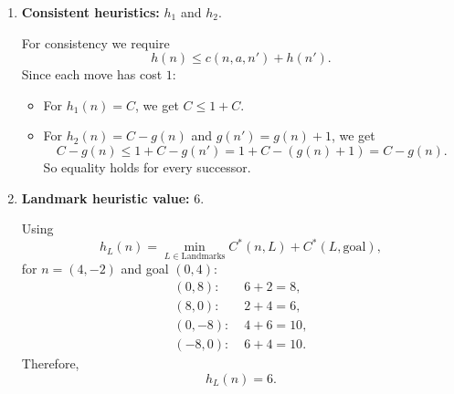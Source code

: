 \documentclass[11pt]{article}
\begin{document}
\begin{enumerate}
In this problem Uniform-Cost Search and Breadth-First Search behave the same because every move has cost $1$. Therefore the same three heuristics from Question 4 also match Uniform-Cost Search behavior.

\item \textbf{Consistent heuristics:} $h_1$ and $h_2$.

For consistency we require
\[
h(n) \le c(n,a,n') + h(n').
\]
Since each move has cost $1$:
\begin{itemize}
\item For $h_1(n)=C$, we get $C \le 1 + C$.
\item For $h_2(n)=C-g(n)$ and $g(n')=g(n)+1$, we get
\[
C-g(n) \le 1 + C - g(n') = 1 + C - (g(n)+1) = C-g(n).
\]
So equality holds for every successor.
\end{itemize}

\item \textbf{Landmark heuristic value:} $6$.

Using
\[
h_L(n)=\min_{L \in \text{Landmarks}} C^*(n,L) + C^*(L,\text{goal}),
\]
for $n=(4,-2)$ and goal $(0,4)$:
\begin{align*}
(0,8):\;& 6 + 2 = 8,\\
(8,0):\;& 2 + 4 = 6,\\
(0,-8):\;& 4 + 6 = 10,\\
(-8,0):\;& 6 + 4 = 10.
\end{align*}
Therefore,
\[
h_L(n)=6.
\]
\end{enumerate}
\end{document}
